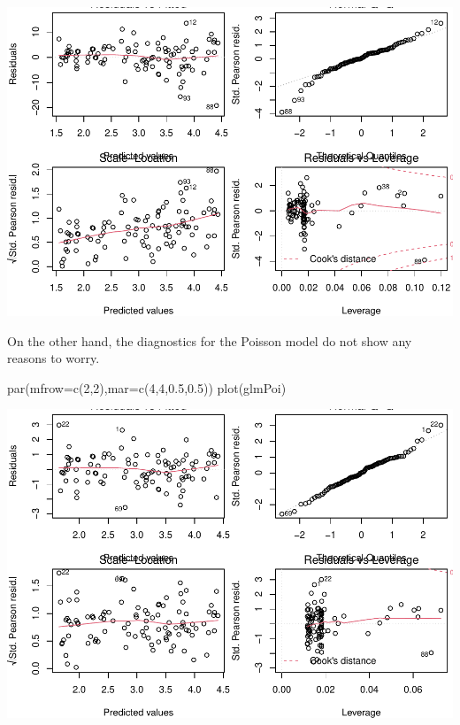 \documentclass[
]{book}
\newenvironment{Shaded}{\begin{snugshade}}{\end{snugshade}}
\newcommand{\AttributeTok}[1]{\textcolor[rgb]{0.77,0.63,0.00}{#1}}
\newcommand{\DecValTok}[1]{\textcolor[rgb]{0.00,0.00,0.81}{#1}}
\newcommand{\FloatTok}[1]{\textcolor[rgb]{0.00,0.00,0.81}{#1}}
\newcommand{\FunctionTok}[1]{\textcolor[rgb]{0.00,0.00,0.00}{#1}}
\newcommand{\NormalTok}[1]{#1}
\begin{document}
\includegraphics{ECOMODbook_files/figure-latex/glm6-1.pdf}

On the other hand, the diagnostics for the Poisson model do not show any reasons to worry.

\begin{Shaded}
\begin{Highlighting}[]
\FunctionTok{par}\NormalTok{(}\AttributeTok{mfrow=}\FunctionTok{c}\NormalTok{(}\DecValTok{2}\NormalTok{,}\DecValTok{2}\NormalTok{),}\AttributeTok{mar=}\FunctionTok{c}\NormalTok{(}\DecValTok{4}\NormalTok{,}\DecValTok{4}\NormalTok{,}\FloatTok{0.5}\NormalTok{,}\FloatTok{0.5}\NormalTok{))}
\FunctionTok{plot}\NormalTok{(glmPoi)}
\end{Highlighting}
\end{Shaded}

\includegraphics{ECOMODbook_files/figure-latex/glm7-1.pdf}
\end{document}

